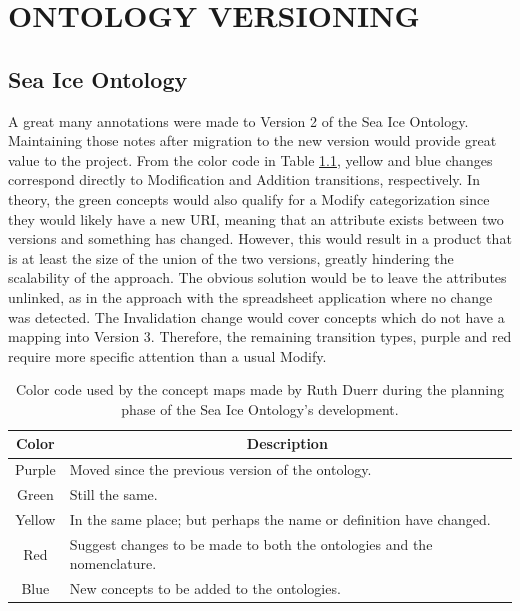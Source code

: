 
\chapter{ONTOLOGY VERSIONING}

\section{Sea Ice Ontology}

A great many annotations were made to Version 2 of the Sea Ice Ontology.
Maintaining those notes after migration to the new version would provide great value to the project.
From the color code in Table \ref{ColorTable}, yellow and blue changes correspond directly to Modification and Addition transitions, respectively.
In theory, the green concepts would also qualify for a Modify categorization since they would likely have a new URI, meaning that an attribute exists between two versions and something has changed.
However, this would result in a product that is at least the size of the union of the two versions, greatly hindering the scalability of the approach.
The obvious solution would be to leave the attributes unlinked, as in the approach with the spreadsheet application where no change was detected.
The Invalidation change would cover concepts which do not have a mapping into Version 3.
Therefore, the remaining transition types, purple and red require more specific attention than a usual Modify.

\begin{table}
	\newcommand*{\thead}[1]{\multicolumn{1}{|c|}{\bfseries #1}}
	\centering
	\begin{tabular}{ | c | l |}
		\hline
		\textbf{Color} & \thead{Description} \\
		\hline
		Purple & Moved since the previous version of the ontology.\\
		\hline
		Green & Still the same.\\
		\hline
		Yellow & In the same place; but perhaps the name or definition have changed.\\
		\hline
		Red & Suggest changes to be made to both the ontologies and the nomenclature.\\
		\hline
		Blue & New concepts to be added to the ontologies.\\
		\hline
	\end{tabular}
	\label{ColorTable}
	\caption{Color code used by the concept maps made by Ruth Duerr during the planning phase of the Sea Ice Ontology's development.}
\end{table}

